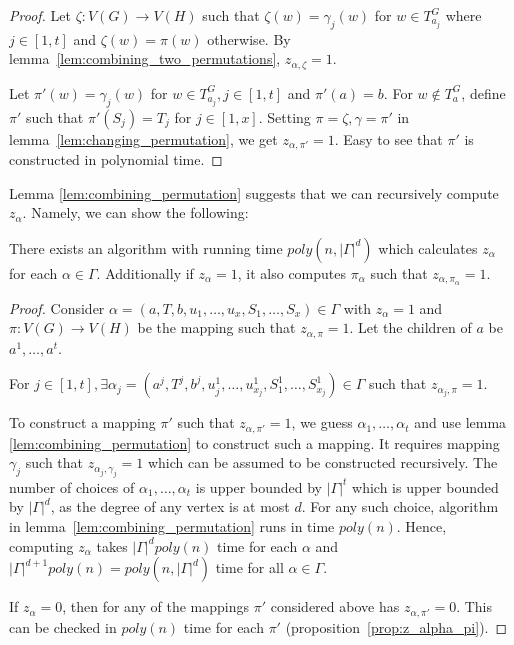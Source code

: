 \begin{proof}
  Let $\zeta:V(G) \rightarrow V(H)$ such that $\zeta(w) = \gamma_j(w)$
  for $w \in T_{a_j}^G$ where $j \in [1,t]$ and $\zeta(w) = \pi(w)$
  otherwise. By lemma~\ref{lem:combining_two_permutations},
  $z_{\alpha,\zeta} = 1$.

   Let $\pi'(w) = \gamma_j(w) $
  for $w \in T_{a_j}^G, j \in [1,t]$ and $\pi'(a) =b$. For
  $w \not\in T_a^G$, define $\pi'$ such that $\pi'(S_j) = T_j$ for
  $j \in [1,x]$.   Setting $\pi = \zeta, \gamma = \pi'$ in lemma~\ref{lem:changing_permutation}, we get $z_{\alpha,\pi'} = 1$.  Easy
  to see that $\pi'$ is constructed in polynomial time.
\end{proof}
%
Lemma \ref{lem:combining_permutation} suggests that we can recursively
compute $z_{\alpha}$. Namely, we can show the following:
%
\begin{lemma}\label{lem:computing_z_alpha}
  There exists an algorithm with running time $poly(n,|\Gamma|^d)$
  which calculates $z_{\alpha}$ for each $\alpha \in
  \Gamma$. Additionally if $z_{\alpha} = 1$, it also computes
  $\pi_{\alpha}$ such that $z_{\alpha,\pi_{\alpha}} = 1$.
\end{lemma}
%
\begin{proof}
  Consider $\alpha = (a,T,b,u_1,\dots,u_x,S_1,\dots,S_x)\in \Gamma$
  with $z_{\alpha} = 1$ and $\pi:V(G) \rightarrow V(H)$ be the mapping
  such that $z_{\alpha,\pi}=1$. Let the children of $a$ be
  $a^1,\dots,a^t$.
  \begin{claim}
    For
    $j \in [1,t],\exists \alpha_j =
    (a^j,T^j,b^j,u_j^1,\dots,u_{x_j}^1, S_1^1,\dots,S_{x_j}^1)\in
    \Gamma$ such that $z_{\alpha_j,\pi} = 1$.
  \end{claim}
  To construct a mapping $\pi'$ such that $z_{\alpha,\pi'} = 1$, we
  guess $\alpha_1,\dots,\alpha_t$ and use lemma
  \ref{lem:combining_permutation} to construct such a mapping. It
  requires mapping $\gamma_j$ such that $z_{\alpha_j,\gamma_j} = 1$
  which can be assumed to be constructed recursively. The number of
  choices of $\alpha_1,\dots,\alpha_t$ is upper bounded by
  $|\Gamma|^t$ which is upper bounded by $|\Gamma|^d$, as the degree
  of any vertex is at most $d$. For any such choice, algorithm in lemma~\ref{lem:combining_permutation} runs in time $poly(n)$. Hence,
  computing $z_{\alpha}$ takes $|\Gamma|^d poly(n)$ time for each
  $\alpha$ and $|\Gamma|^{d+1} poly(n) = poly(n,|\Gamma|^d)$ time for
  all $\alpha \in \Gamma$.

  If $z_{\alpha} = 0$, then for any of the mappings $\pi'$ considered
  above has $z_{\alpha,\pi'} = 0$. This can be checked in $poly(n)$
  time for each $\pi'$ (proposition~\ref{prop:z_alpha_pi}).
\end{proof}

